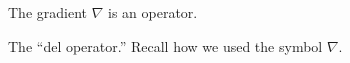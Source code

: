 \documentclass{book} %
\begin{document}
The gradient $\nabla$ is an operator.

\cleardoublepage %

The ``del operator.'' Recall how we used the symbol $\nabla$.

\printindex
\end{document}
